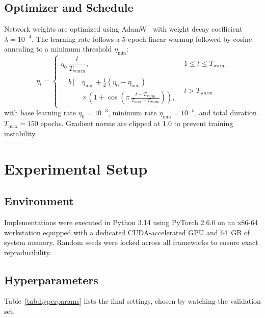 \documentclass[conference,10pt,letterpaper]{IEEEtran}
\begin{document}
\subsection{Optimizer and Schedule}
Network weights are optimized using AdamW~\cite{loshchilov2017decoupled} with weight decay coefficient $\lambda = 10^{-4}$. The learning rate follows a 5-epoch linear warmup followed by cosine annealing to a minimum threshold $\eta_{\min}$:
\begin{equation}
\eta_t = \begin{cases}
\eta_0 \,\dfrac{t}{T_{\text{warm}}}, & 1 \le t \le T_{\text{warm}} \\[6pt]
\begin{aligned}[b]
&\eta_{\min} + \tfrac{1}{2}(\eta_0 - \eta_{\min}) \\
&\times \left(1 + \cos\!\left(\pi\,\tfrac{t - T_{\text{warm}}}{T_{\max} - T_{\text{warm}}}\right)\right),
\end{aligned} & t > T_{\text{warm}}
\end{cases}
\end{equation}
with base learning rate $\eta_0 = 10^{-3}$, minimum rate $\eta_{\min} = 10^{-5}$, and total duration $T_{\max} = 150$ epochs. Gradient norms are clipped at 1.0 to prevent training instability.

\section{Experimental Setup}

\subsection{Environment}
Implementations were executed in Python 3.14 using PyTorch 2.6.0 on an x86-64 workstation equipped with a dedicated CUDA-accelerated GPU and 64~GB of system memory. Random seeds were locked across all frameworks to ensure exact reproducibility.

\subsection{Hyperparameters}
Table~\ref{tab:hyperparams} lists the final settings, chosen by watching the validation set.
\end{document}
